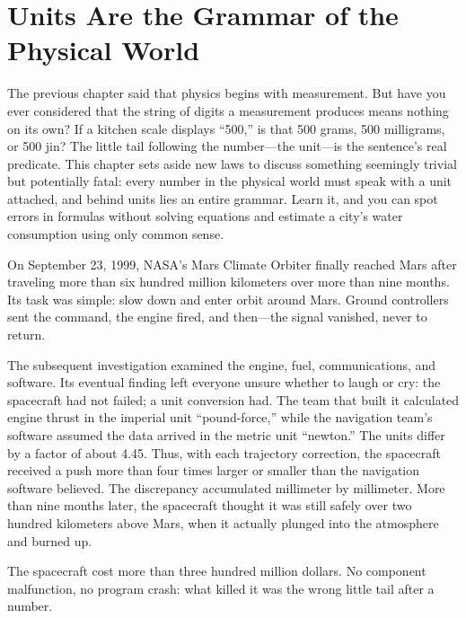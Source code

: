 \chapter{Units Are the Grammar of the Physical World}

The previous chapter said that physics begins with measurement. But have you ever considered that the string of digits a measurement produces means nothing on its own? If a kitchen scale displays ``500,'' is that 500 grams, 500 milligrams, or 500 jin? The little tail following the number---the unit---is the sentence's real predicate. This chapter sets aside new laws to discuss something seemingly trivial but potentially fatal: every number in the physical world must speak with a unit attached, and behind units lies an entire grammar. Learn it, and you can spot errors in formulas without solving equations and estimate a city's water consumption using only common sense.


On September 23, 1999, NASA's Mars Climate Orbiter finally reached Mars after traveling more than six hundred million kilometers over more than nine months. Its task was simple: slow down and enter orbit around Mars. Ground controllers sent the command, the engine fired, and then---the signal vanished, never to return.

The subsequent investigation examined the engine, fuel, communications, and software. Its eventual finding left everyone unsure whether to laugh or cry: the spacecraft had not failed; a unit conversion had. The team that built it calculated engine thrust in the imperial unit ``pound-force,'' while the navigation team's software assumed the data arrived in the metric unit ``newton.'' The units differ by a factor of about 4.45. Thus, with each trajectory correction, the spacecraft received a push more than four times larger or smaller than the navigation software believed. The discrepancy accumulated millimeter by millimeter. More than nine months later, the spacecraft thought it was still safely over two hundred kilometers above Mars, when it actually plunged into the atmosphere and burned up.

The spacecraft cost more than three hundred million dollars. No component malfunction, no program crash: what killed it was the wrong little tail after a number.

